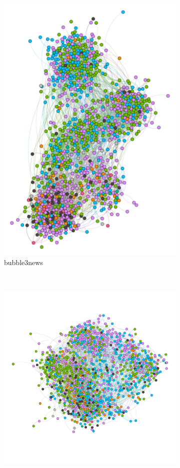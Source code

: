 \begin{figure}
  ~
  \begin{subfigure}[t]{0.35\textwidth}
    \includegraphics[width=\textwidth]{img/dim5_news.pdf}
    \caption{bubble3news}
    \label{fig:bubble5news}
  \end{subfigure}
  ~
  \begin{subfigure}[t]{0.35\textwidth}
    \includegraphics[width=\textwidth]{img/dim7_news.pdf}

\end{subfigure}
\end{figure}
